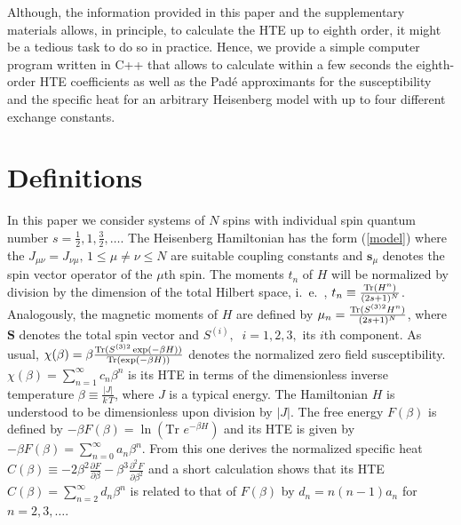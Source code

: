 \documentclass[aps,twocolumn,groupedaddress]{revtex4}
\begin{document}
Although, the information provided in this paper and the
supplementary materials\cite{supp1} allows, in principle, to calculate
the HTE up to eighth order, it might be a tedious task to do so in
practice. Hence, we provide a simple computer program written in
 C++ that allows to calculate within  a few seconds the eighth-order HTE
coefficients as well as the Pad\'e approximants for the
susceptibility and the specific heat for an arbitrary Heisenberg
model with up to four different exchange constants\cite{program}.





\section{Definitions}\label{sec:D}
In this paper we consider systems of $N$ spins with individual spin
quantum number $s=\frac{1}{2},1,\frac{3}{2},\ldots$. The Heisenberg
Hamiltonian has the form (\ref{model}) where the
$J_{\mu\nu}=J_{\nu\mu},\,1\le\mu\neq\nu\le N$ are suitable coupling
constants and $\mathbf{s}_\mu$ denotes the spin vector operator of
the $\mu$th spin. The moments $t_n$ of $H$ will be normalized by
division by the dimension of the total Hilbert space,
i.~e.~, $t_n\equiv\frac{\mbox{\scriptsize Tr}(H^n)}{(2s+1)^N}$.
Analogously, the magnetic moments of $H$ are defined by
$\mu_n=\frac{\mbox{\scriptsize
Tr}(S^{(3)2}H^n)}{(2s+1)^N}$, where $\mathbf{S}$ denotes
the total spin vector and ${S}^{(i)},\;\;i=1,2,3,$ its $i$th
component. As usual, $\chi(\beta)=\beta \frac{\mbox{\scriptsize
Tr}({S}^{(3)2}\exp(-\beta H))} {\mbox{\scriptsize
Tr}(\exp(-\beta H))}$ denotes the normalized zero field
susceptibility. $\chi(\beta)=\sum_{n=1}^{\infty} c_n \beta^n$ is its
HTE in terms of the dimensionless
inverse temperature $\beta\equiv\frac{|J|}{k\,T}$, where $J$ is a
typical energy. The Hamiltonian $H$ is understood to be
dimensionless upon division by $|J|$. The free energy $F(\beta)$ is
defined by $-\beta F(\beta)=\ln\left( \mbox{Tr } e^{-\beta
H}\right)$ and its HTE is given by $-\beta
F(\beta)=\sum_{n=0}^{\infty} a_n \beta^n$. From this one derives the
normalized specific heat $C(\beta)\equiv -2\beta^2\frac{\partial
F}{\partial \beta}-\beta^3\frac{\partial^2 F}{\partial \beta^2}$ and
a short calculation shows that its HTE $C(\beta)=\sum_{n=2}^{\infty}
d_n \beta^n$ is related to that of $F(\beta)$ by $d_n=n(n-1)a_n$ for
$n=2,3,\ldots$. \\
\end{document}
